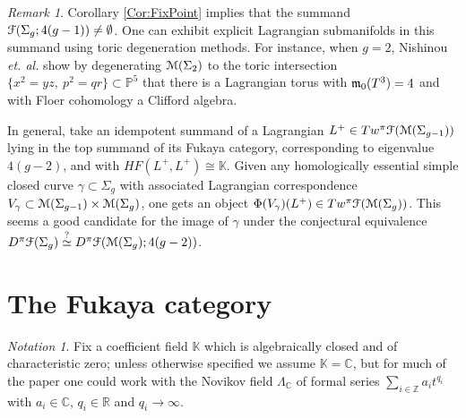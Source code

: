 \documentclass[reqno,10pt]{amsart}
\numberwithin{equation}{section}
\newcommand{\bC}{{\mathbb C}}
\newcommand{\bK}{{\mathbb K}}
\newcommand{\bP}{{\mathbb P}}
\newcommand{\bR}{{\mathbb R}}
\newcommand{\bZ}{{\mathbb Z}}
\newcommand{\scrF}{\EuScript{F}}
\newcommand{\scrM}{\EuScript{M}}
\theoremstyle{remark}
\newtheorem{Remark}[thm]{Remark}
\newtheorem*{Notation}{Notation}
\begin{document}
\begin{Remark} \label{Rmk:PreciseConj}
Corollary \ref{Cor:FixPoint} implies that the summand $\scrF(\Sigma_g;4(g-1)) \neq \emptyset$.  One can exhibit explicit Lagrangian submanifolds in this summand using toric degeneration methods. For instance, when $g=2$, Nishinou \emph{et. al.} \cite{Nishinou} show by degenerating $\scrM(\Sigma_2)$ to the toric intersection $\{x^2=yz, \ p^2=qr\} \subset \bP^5$ that there is a Lagrangian torus with $\frak{m}_0(T^3) = 4$ and with Floer cohomology a Clifford algebra.

In general, take an idempotent summand of a  Lagrangian  $L^+ \in Tw^{\pi}\scrF(\scrM(\Sigma_{g-1}))$ lying in the top summand of its Fukaya category,  corresponding to eigenvalue $4(g-2)$, and with $HF(L^+, L^+) \cong \bK$.  Given any homologically essential simple closed curve $\gamma \subset \Sigma_{g}$ with associated Lagrangian correspondence $V_{\gamma} \subset \scrM(\Sigma_{g-1}) \times \scrM(\Sigma_{g})$, one gets an object $\Phi(V_{\gamma})(L^+) \in Tw^{\pi}\scrF(\scrM(\Sigma_{g}))$. This seems a good candidate for the image of $\gamma$ under the conjectural equivalence $D^{\pi} \scrF(\Sigma_{g}) \stackrel{?}{\simeq} D^{\pi}\scrF(\scrM(\Sigma_{g}); 4(g-2))$.
\end{Remark}











\section{The Fukaya category\label{Section:Fukaya}}

\begin{Notation} Fix a coefficient field $\bK$ which is algebraically closed and of characteristic zero; unless otherwise specified we assume $\bK=\bC$, but for much of the paper one could work with the Novikov field $\Lambda_{\bC}$  of formal series $\sum_{i\in \bZ} a_it^{q_i}$ with $a_i\in\bC$, $q_i\in\bR$ and $q_i \rightarrow \infty$.  \end{Notation}
\end{document}

